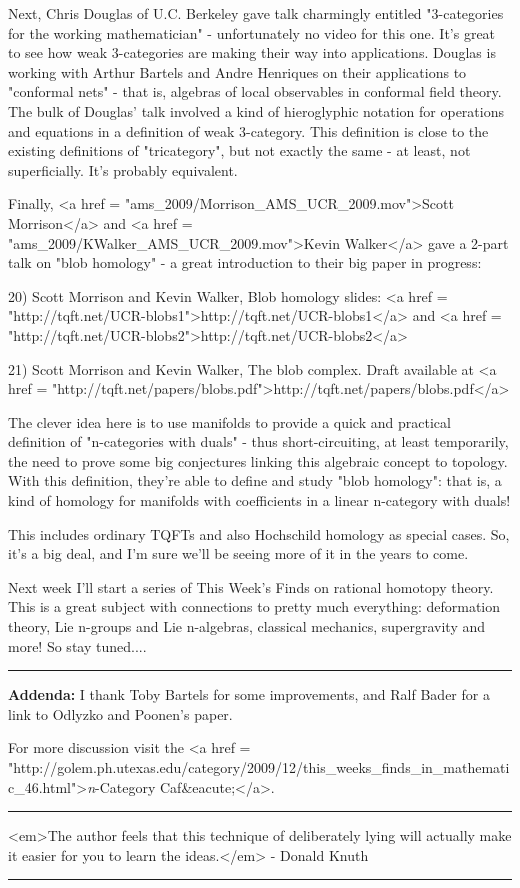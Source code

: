 Next, Chris Douglas of U.C. Berkeley gave talk charmingly entitled
"3-categories for the working mathematician" - 
unfortunately no video for this one.  It's great to see how weak
3-categories are making their way into applications.  Douglas is
working with Arthur Bartels and Andre Henriques on their applications
to "conformal nets" - that is, algebras of local observables
in conformal field theory.  The bulk of Douglas' talk involved a kind
of hieroglyphic notation for operations and equations in a definition
of weak 3-category.  This definition is close to the existing
definitions of "tricategory", but not exactly the same - at
least, not superficially.  It's probably equivalent.

Finally, <a href = "ams_2009/Morrison_AMS_UCR_2009.mov">Scott
Morrison</a> and <a href =
"ams_2009/KWalker_AMS_UCR_2009.mov">Kevin Walker</a> gave a
2-part talk on "blob homology" - a great introduction to
their big paper in progress:

20) Scott Morrison and Kevin Walker, Blob homology slides:
<a href = "http://tqft.net/UCR-blobs1">http://tqft.net/UCR-blobs1</a>
and 
<a href = "http://tqft.net/UCR-blobs2">http://tqft.net/UCR-blobs2</a>

21) Scott Morrison and Kevin Walker, The blob complex.  Draft
available at <a href = "http://tqft.net/papers/blobs.pdf">http://tqft.net/papers/blobs.pdf</a>

The clever idea here is to use manifolds to provide a quick and
practical definition of "n-categories with duals" - thus
short-circuiting, at least temporarily, the need to prove some big
conjectures linking this algebraic concept to topology.  With this
definition, they're able to define and study "blob
homology": that is, a kind of homology for manifolds with
coefficients in a linear n-category with duals!

This includes ordinary TQFTs and also Hochschild homology as special
cases.  So, it's a big deal, and I'm sure we'll be seeing more of it
in the years to come.

Next week I'll start a series of This Week's Finds on rational
homotopy theory.  This is a great subject with connections to 
pretty much everything: deformation theory, Lie n-groups and Lie
n-algebras, classical mechanics, supergravity and more!  So stay
tuned....

\par\noindent\rule{\textwidth}{0.4pt}
\textbf{Addenda:} I thank Toby Bartels for some improvements, and
Ralf Bader for a link to Odlyzko and Poonen's paper.

For more discussion visit the <a href =
"http://golem.ph.utexas.edu/category/2009/12/this_weeks_finds_in_mathematic_46.html">\emph{n}-Category
Caf&eacute;</a>.

\par\noindent\rule{\textwidth}{0.4pt}
<em>The author feels that this technique of deliberately lying will
actually make it easier for you to learn the ideas.</em> - Donald Knuth

\par\noindent\rule{\textwidth}{0.4pt}

